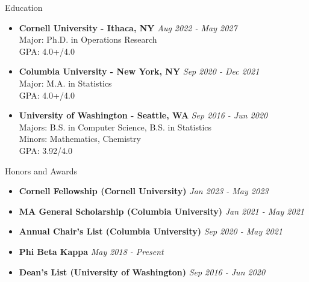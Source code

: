 \documentclass{resume} %
\begin{document}

\begin{rSection}{Education}
\begin{itemize}
\item {\bf Cornell University - Ithaca, NY} \hfill {\em Aug 2022 - May 2027}\\
Major: Ph.D. in Operations Research\\
GPA: 4.0+/4.0
\item {\bf Columbia University - New York, NY} \hfill {\em Sep 2020 - Dec 2021}\\
Major: M.A. in Statistics\\
GPA: 4.0+/4.0
\item {\bf University of Washington - Seattle, WA} \hfill {\em Sep 2016 - Jun 2020}\\
Majors: B.S. in Computer Science, B.S. in Statistics\\
Minors: Mathematics, Chemistry\\
GPA: 3.92/4.0
\end{itemize}
\end{rSection}

\begin{rSection}{Honors and Awards}
\begin{itemize}
\item {\bf Cornell Fellowship (Cornell University)} \hfill {\em Jan 2023 - May 2023}
\item {\bf MA General Scholarship (Columbia University)} \hfill {\em Jan 2021 - May 2021}
\item {\bf Annual Chair's List (Columbia University)} \hfill {\em Sep 2020 - May 2021}
\item {\bf Phi Beta Kappa} \hfill {\em May 2018 - Present}
\item {\bf Dean's List (University of Washington)} \hfill {\em Sep 2016 - Jun 2020}
\end{itemize}
\end{rSection}
\end{document}
